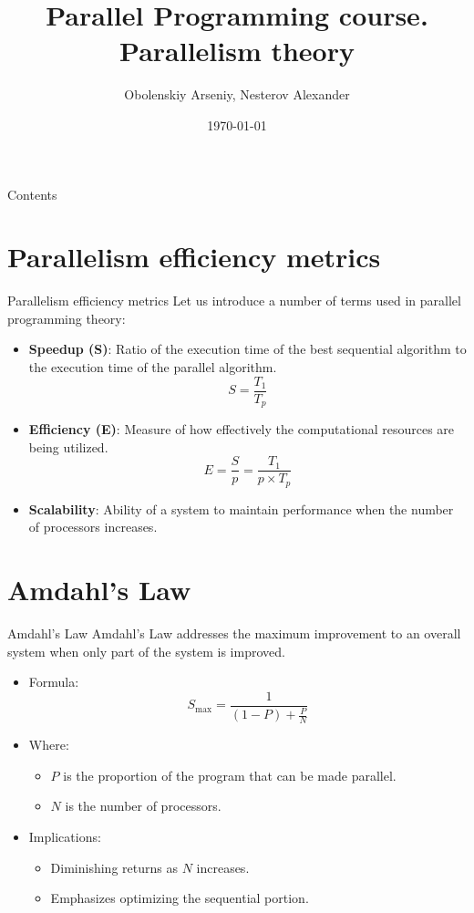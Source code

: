 \documentclass{beamer}
\title[Parallel Programming. Parallelism theory]{Parallel Programming course. Parallelism theory}
\author{Obolenskiy Arseniy, Nesterov Alexander}
\institute{Nizhny Novgorod State University}
\date{\today} %
\begin{document}
\begin{frame}
    \titlepage
\end{frame}

\begin{frame}{Contents}
    \tableofcontents
\end{frame}

\section{Parallelism efficiency metrics}

\begin{frame}{Parallelism efficiency metrics}
  Let us introduce a number of terms used in parallel programming theory:
  \begin{itemize}
    \item \textbf{Speedup (S)}: Ratio of the execution time of the best sequential algorithm to the execution time of the parallel algorithm.
    \[
    S = \frac{T_1}{T_p}
    \]
    \item \textbf{Efficiency (E)}: Measure of how effectively the computational resources are being utilized.
    \[
    E = \frac{S}{p} = \frac{T_1}{p \times T_p}
    \]
    \item \textbf{Scalability}: Ability of a system to maintain performance when the number of processors increases.
  \end{itemize}
\end{frame}

\section{Amdahl's Law}

\begin{frame}{Amdahl's Law}
  Amdahl's Law addresses the maximum improvement to an overall system when only part of the system is improved.
  \begin{itemize}
    \item Formula:
    \[
    S_{\text{max}} = \frac{1}{(1 - P) + \frac{P}{N}}
    \]
    \item Where:
    \begin{itemize}
      \item \( P \) is the proportion of the program that can be made parallel.
      \item \( N \) is the number of processors.
    \end{itemize}
    \item Implications:
    \begin{itemize}
      \item Diminishing returns as \( N \) increases.
      \item Emphasizes optimizing the sequential portion.
    \end{itemize}
  \end{itemize}
\end{frame}
\end{document}
